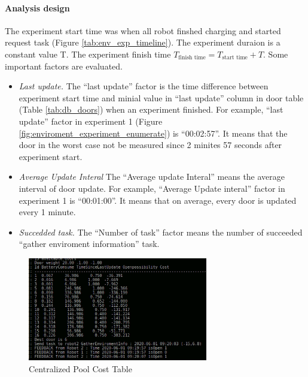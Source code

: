 \paragraph{Analysis design} The experiment start time was when all robot finshed charging and started request task (Figure \ref{tab:env_exp_timeline}). The experiment duraion is a constant value T. The experiment finish time $T_{\mbox{finish time}} = T_{\mbox{start time}} + T $. Some important factors are evaluated. 
\begin{itemize}
    \item \textsl{Last update.} The ``last update'' factor is the time difference between experiment start time and minial value in ``last update'' column in door table (Table \ref{tab:db_doors}) when an experiment finished. For example, ``last update'' factor in experiment 1 (Figure \ref{fig:enviroment_experiment_enumerate}) is ``00:02:57''. It means that the door in the worst case not be measured since 2 minites 57 seconds after experiment start.
    \item \textsl{Average Update Interal} The ``Average update Interal'' means the average interval of door update. For example, ``Average Update interal'' factor in experiment 1 is ``00:01:00''. It means that on average, every door is updated every 1 minute.
    \item \textsl{Succedded task.} The ``Number of task'' factor  means the number of succeeded ``gather enviroment information'' task.
\end{itemize}

\begin{figure}[htbp]
    \centering
    \includegraphics[width = 0.7\textwidth]{content/images/ch5/weight_analyze.png}
    \caption{Centralized Pool Cost Table}
    \label{fig:cost_table}
\end{figure}

